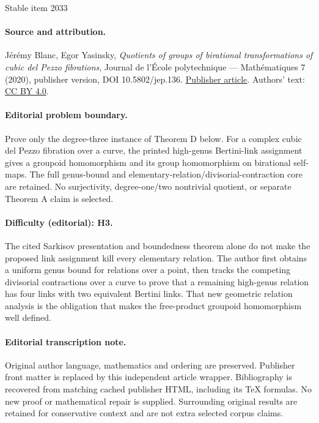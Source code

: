 \documentclass[11pt]{article}
\numberwithin{equation}{section}
\theoremstyle{plain}
\theoremstyle{definition}
\begin{document}
\begin{center}{\Large Stable item 2033}\end{center}
\paragraph{Source and attribution.}
Jérémy Blanc, Egor Yasinsky, \emph{Quotients of groups of birational transformations of cubic del Pezzo fibrations}, Journal de l’École polytechnique — Mathématiques 7 (2020), publisher version, DOI 10.5802/jep.136. \href{https://jep.centre-mersenne.org/articles/10.5802/jep.136/}{Publisher article}. Authors' text: \href{https://creativecommons.org/licenses/by/4.0/}{CC BY 4.0}.
\paragraph{Editorial problem boundary.}
Prove only the degree-three instance of Theorem D below. For a complex cubic del Pezzo fibration over a curve, the printed high-genus Bertini-link assignment gives a groupoid homomorphism and its group homomorphism on birational self-maps. The full genus-bound and elementary-relation/divisorial-contraction core are retained. No surjectivity, degree-one/two nontrivial quotient, or separate Theorem A claim is selected.
\paragraph{Difficulty (editorial): H3.}
The cited Sarkisov presentation and boundedness theorem alone do not make the proposed link assignment kill every elementary relation. The author first obtains a uniform genus bound for relations over a point, then tracks the competing divisorial contractions over a curve to prove that a remaining high-genus relation has four links with two equivalent Bertini links. That new geometric relation analysis is the obligation that makes the free-product groupoid homomorphism well defined.
\paragraph{Editorial transcription note.}
Original author language, mathematics and ordering are preserved. Publisher front matter is replaced by this independent article wrapper. Bibliography is recovered from matching cached publisher HTML, including its TeX formulas. No new proof or mathematical repair is supplied. Surrounding original results are retained for conservative context and are not extra selected corpus claims.
\clearpage
\end{document}
